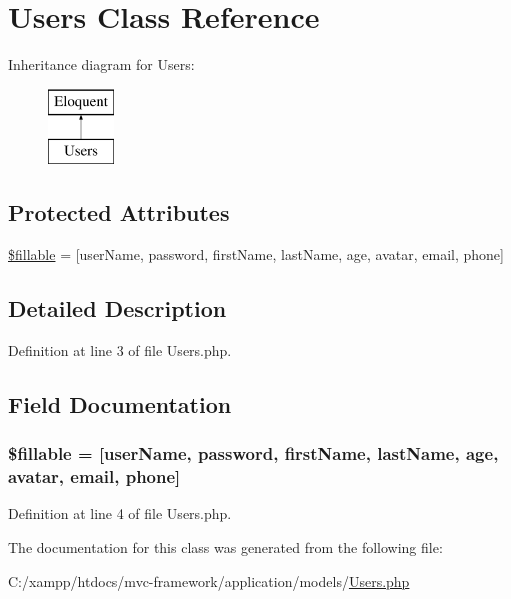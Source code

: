 \hypertarget{class_users}{}\section{Users Class Reference}
\label{class_users}
Inheritance diagram for Users\+:\begin{figure}[H]
\begin{center}
\leavevmode
\includegraphics[height=2.000000cm]{class_users}
\end{center}
\end{figure}
\subsection*{Protected Attributes}
\begin{DoxyCompactItemize}
\item 
\hyperlink{class_users_a6a90e74ccdf5efd70d51d10c906f8e32}{\$fillable} = \mbox{[}\textquotesingle{}user\+Name\textquotesingle{}, \textquotesingle{}password\textquotesingle{}, \textquotesingle{}first\+Name\textquotesingle{}, \textquotesingle{}last\+Name\textquotesingle{}, \textquotesingle{}age\textquotesingle{}, \textquotesingle{}avatar\textquotesingle{}, \textquotesingle{}email\textquotesingle{}, \textquotesingle{}phone\textquotesingle{}\mbox{]}
\end{DoxyCompactItemize}


\subsection{Detailed Description}


Definition at line 3 of file Users.\+php.



\subsection{Field Documentation}
\hypertarget{class_users_a6a90e74ccdf5efd70d51d10c906f8e32}{}
\subsubsection[{\$fillable}]{\setlength{\rightskip}{0pt plus 5cm}\$fillable = \mbox{[}\textquotesingle{}user\+Name\textquotesingle{}, \textquotesingle{}password\textquotesingle{}, \textquotesingle{}first\+Name\textquotesingle{}, \textquotesingle{}last\+Name\textquotesingle{}, \textquotesingle{}age\textquotesingle{}, \textquotesingle{}avatar\textquotesingle{}, \textquotesingle{}email\textquotesingle{}, \textquotesingle{}phone\textquotesingle{}\mbox{]}\hspace{0.3cm}{\ttfamily [protected]}}\label{class_users_a6a90e74ccdf5efd70d51d10c906f8e32}


Definition at line 4 of file Users.\+php.



The documentation for this class was generated from the following file\+:\begin{DoxyCompactItemize}
\item 
C\+:/xampp/htdocs/mvc-\/framework/application/models/\hyperlink{_users_8php}{Users.\+php}\end{DoxyCompactItemize}
